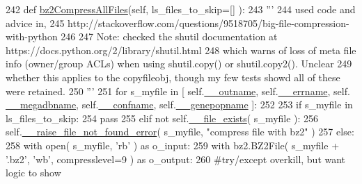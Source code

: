\begin{DoxyCode}
242     \textcolor{keyword}{def }\hyperlink{classnegui_1_1pgoutputsimupop_1_1PGOutputSimuPop_a3046e1eac1fbd82acf47c0f7c0d06b70}{bz2CompressAllFiles}(self, ls\_files\_to\_skip=[] ):
243         \textcolor{stringliteral}{'''}
244 \textcolor{stringliteral}{        used code and advice in, }
245 \textcolor{stringliteral}{        http://stackoverflow.com/questions/9518705/big-file-compression-with-python}
246 \textcolor{stringliteral}{}
247 \textcolor{stringliteral}{        Note: checked the shutil documentation at https://docs.python.org/2/library/shutil.html}
248 \textcolor{stringliteral}{        which warns of loss of meta file info (owner/group ACLs) when using shutil.copy() or
       shutil.copy2().  Unclear}
249 \textcolor{stringliteral}{        whether this applies to the copyfileobj, though my few tests showd all of these were retained.}
250 \textcolor{stringliteral}{        '''}
251         \textcolor{keywordflow}{for} s\_myfile \textcolor{keywordflow}{in} [ self.\hyperlink{classnegui_1_1pgoutputsimupop_1_1PGOutputSimuPop_a50f64be6bb990a0ac6898a44b4bf6fbc}{\_\_outname}, self.\hyperlink{classnegui_1_1pgoutputsimupop_1_1PGOutputSimuPop_a26363a7bbc4ae53b86585e32f0360e2a}{\_\_errname}, self.
      \hyperlink{classnegui_1_1pgoutputsimupop_1_1PGOutputSimuPop_aa89de70104807ce7e26bb17310f74b97}{\_\_megadbname}, self.\hyperlink{classnegui_1_1pgoutputsimupop_1_1PGOutputSimuPop_af5c9a72247505d2c2bb3d7400cbc09b3}{\_\_confname}, self.\hyperlink{classnegui_1_1pgoutputsimupop_1_1PGOutputSimuPop_a05d91a106b2529b6cbae7777717a03b6}{\_\_genepopname} ]:
252             
253             \textcolor{keywordflow}{if} s\_myfile \textcolor{keywordflow}{in} ls\_files\_to\_skip:
254                 \textcolor{keywordflow}{pass}
255             \textcolor{keywordflow}{elif} \textcolor{keywordflow}{not} self.\hyperlink{classnegui_1_1pgoutputsimupop_1_1PGOutputSimuPop_a1fdfb988619bd4a9d377a1e20f52839c}{\_\_file\_exists}( s\_myfile ):
256                 self.\hyperlink{classnegui_1_1pgoutputsimupop_1_1PGOutputSimuPop_abf6aab4f7982c2b0f9e4544343bf241b}{\_\_raise\_file\_not\_found\_error}( s\_myfile, \textcolor{stringliteral}{"compress file
       with bz2"}  )
257             \textcolor{keywordflow}{else}:
258                 with open( s\_myfile, \textcolor{stringliteral}{'rb'} ) \textcolor{keyword}{as} o\_input:
259                     with bz2.BZ2File( s\_myfile + \textcolor{stringliteral}{'.bz2'}, \textcolor{stringliteral}{'wb'}, compresslevel=9 ) \textcolor{keyword}{as} o\_output:
260                         \textcolor{comment}{#try/except overkill, but want logic to show}

\end{DoxyCode}
